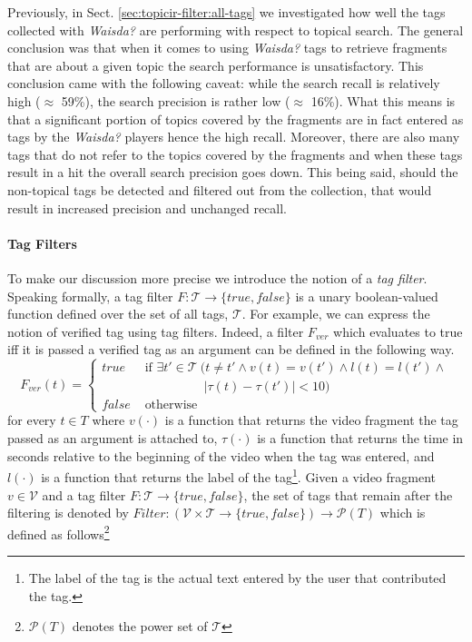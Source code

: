 Previously, in Sect. \ref{sec:topicir-filter:all-tags} we investigated how well the tags collected with \textit{Waisda?} are performing with respect to topical search. The general conclusion was that when it comes to using \textit{Waisda?} tags to retrieve fragments that are about a given topic the search performance is  unsatisfactory. This conclusion came with the following caveat: while the search recall is relatively high ($\approx$ 59\%), the search precision is rather low ($\approx$ 16\%). What this means is that a significant portion of topics covered by the fragments are in fact entered as tags by the \textit{Waisda?} players hence the high recall. Moreover, there are also many tags that do not refer to the topics covered by the fragments and when these tags result in a hit the overall search precision goes down. This being said, should the non-topical tags be detected and filtered out from the collection, that would result in increased precision and unchanged recall.
\paragraph{Tag Filters} To make our discussion more precise 	we introduce the notion of a \textit{tag filter}. Speaking formally, a tag filter $F: \mathcal{T}\rightarrow\{true, false\}$ is a unary boolean-valued function defined over the set of all tags, $\mathcal{T}$. For example, we can express the notion of verified tag using tag filters. Indeed, a filter $F_{ver}$ which evaluates to true iff it is passed a verified tag as an argument can be defined in the following way.
\begin{equation*}
F_{ver}(t) = \left\{ 
	\begin{array}{rl}
	true &\mbox{ if $\exists t' \in \mathcal{T}~(t \neq t' \wedge v(t) = v(t') \wedge l(t) = l(t') \wedge $}\\
		& \mbox{~~~~~~~~~~~~~~ $|\tau(t) - \tau(t')| < 10)$} \\
	false &\mbox{ otherwise}
	\end{array}
\right.
\end{equation*}
for every $t \in T$ where $v(\cdot)$ is a function that returns the video fragment the tag passed as an argument is attached to,  $\tau(\cdot)$ is a function that returns the time in seconds relative to the beginning of the video when the tag was entered, and $l(\cdot)$ is a function that returns the label of the tag\footnote{The label of the tag is the actual text entered by the user that contributed the tag.}. Given a video fragment $v \in \mathcal{V}$ and a tag filter $F: \mathcal{T}\rightarrow\{true, false\}$, the set of tags that remain after the filtering is denoted by $Filter:(\mathcal{V} \times \mathcal{T}\rightarrow\{true, false\})\rightarrow \mathcal{P}({T})$ which is defined as follows\footnote{$\mathcal{P}({T})$ denotes the power set of $\mathcal{T}$}

